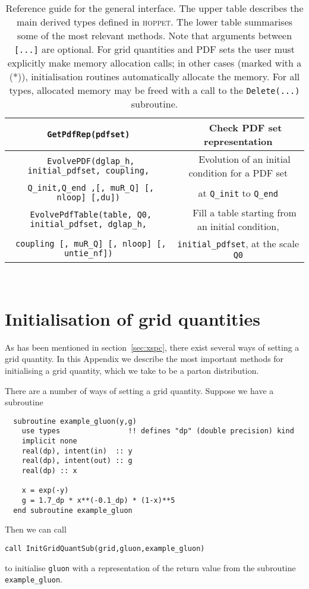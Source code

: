 \documentclass[12pt]{article}
\newcommand{\hoppet}{\textsc{hoppet}\xspace}
\newcommand{\ttt}[1]{\texttt{#1}}
\begin{document}
\begin{table}
\begin{center}
\begin{tabular}{|c|c|}
\hline
\texttt{
GetPdfRep(pdfset)
} & ~~
Check PDF set representation \\
\hline
\texttt{
 EvolvePDF(dglap\_h, initial\_pdfset, coupling,}
 & ~~
Evolution of an initial condition for a PDF set \\
\texttt{ Q\_init,Q\_end ,[, muR\_Q] [, nloop] [,du])} 
& at {\tt Q\_init} to  {\tt Q\_end} \\
\hline
\texttt{
 EvolvePdfTable(table, Q0, initial\_pdfset, dglap\_h,} 
 & ~~ 
Fill a table starting from an initial condition,\\
\texttt{ coupling  [, muR\_Q] [, nloop] [, untie\_nf])} 
& \ttt{initial\_pdfset}, at the scale {\tt Q0} \\ 
\hline
\end{tabular} \\
\end{center}
\caption{\label{tab:general}
Reference guide for the general interface.
The upper table describes the main
derived types defined in \hoppet.
%
The lower table summarises some of the most relevant methods. Note that arguments
between \texttt{[...]} are optional. For grid quantities and PDF sets
the user must explicitly make memory allocation calls; in other cases
(marked with a (*)), initialisation routines automatically
allocate the memory. For all types, allocated memory may be freed with
a call to the \ttt{Delete(...)} subroutine. }
\end{table}




\section{Initialisation of grid quantities}
\label{sec:gridinit}
As has been mentioned in
section~\ref{sec:xspc},  
there exist several ways of setting a grid quantity. In this
Appendix we describe the most important methods for initialising
a grid quantity, which we take to be a parton distribution.

There are a number of ways of setting a grid quantity. Suppose we have
a subroutine
\begin{lstlisting}
  subroutine example_gluon(y,g)
    use types                !! defines "dp" (double precision) kind
    implicit none
    real(dp), intent(in)  :: y
    real(dp), intent(out) :: g
    real(dp) :: x
    
    x = exp(-y)
    g = 1.7_dp * x**(-0.1_dp) * (1-x)**5 
  end subroutine example_gluon
\end{lstlisting}
Then we can call
\begin{lstlisting}
call InitGridQuantSub(grid,gluon,example_gluon)
\end{lstlisting}
to initialise \texttt{gluon} with a representation of the return value
from the subroutine \texttt{example\_gluon}.
\end{document}
